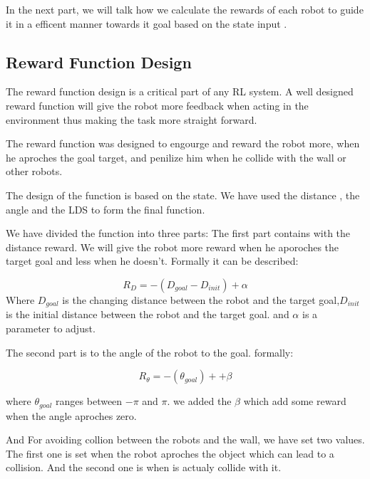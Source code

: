 \documentclass[12pt]{extarticle}
\begin{document}
In the next part, we will talk how we calculate the rewards of each robot to guide it in a efficent manner  towards it goal based on the state input  .
 



\pagebreak

\subsection{Reward Function Design}

The reward function design is a critical part of any RL system. A well designed reward function will give the  robot more feedback when acting in the environment thus making the task more straight forward.

The reward function was designed to engourge and reward the robot  more, when he  aproches the goal target, and penilize him when he collide with the wall or other robots.

The design of the function is based on the state. We have used the distance , the  angle and the LDS to form the final function.

We have   divided  the function into three parts:
The first part contains with the distance reward. We will give the robot more reward when he aporoches the target goal and less when he doesn't. Formally
it can be described:
   
\setcounter{equation}{0}

       \begin{equation} \label{dist_r}
     R_{D}=-(D_{goal}-D_{init})+\alpha
   \end{equation}
    Where $D_{goal}$  is the changing distance between the robot and the target goal,${D_{init}}$ is the initial distance between the robot and the target goal. and $\alpha$ is a parameter to adjust.
    
The second part is to the angle of the robot to the goal. formally:



     \begin{equation} \label{angle_r}
     R_{\theta}=-(\theta_{goal})+ + \beta
   \end{equation}
 
 where $\theta_{goal}$  ranges  between $-\pi$  and $\pi$. we added the $\beta$ which add some reward when the  angle aproches zero.
  
And For avoiding collion between the robots and the wall, we have set two values. The first one is set  when the robot aproches the object which can lead to a collision. And the second one is when is actualy collide  with it.
\end{document}
